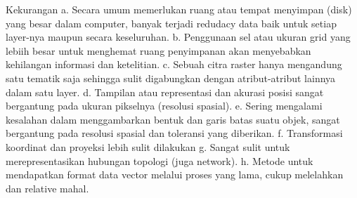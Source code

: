  Kekurangan
 a. Secara umum memerlukan ruang atau tempat menyimpan (disk) yang besar dalam computer, 
    banyak terjadi redudacy data baik untuk setiap layer-nya maupun secara keseluruhan.
 b. Penggunaan sel atau ukuran grid yang lebiih besar untuk menghemat ruang penyimpanan akan 
    menyebabkan kehilangan informasi dan ketelitian.
 c. Sebuah citra raster hanya mengandung satu tematik saja sehingga sulit digabungkan 
    dengan atribut-atribut lainnya dalam satu layer.
 d. Tampilan atau representasi dan akurasi posisi sangat bergantung pada ukuran pikselnya (resolusi spasial).
 e. Sering mengalami kesalahan dalam menggambarkan bentuk dan garis batas suatu objek, 
    sangat bergantung pada resolusi spasial dan toleransi yang diberikan.
 f. Transformasi koordinat dan proyeksi lebih sulit dilakukan
 g. Sangat sulit untuk merepresentasikan hubungan topologi (juga network).
 h. Metode untuk mendapatkan format data vector melalui proses yang lama, cukup melelahkan dan relative mahal.
 
 
